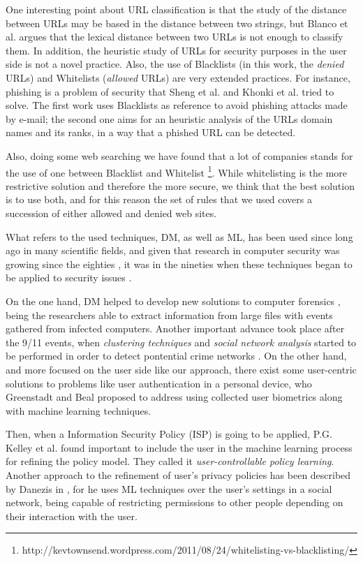 \documentclass{llncs}
\begin{document}
One interesting point about URL classification is that the study of the distance between URLs may be based in the distance between two strings, but Blanco et al. \cite{Blanco2011} argues that the lexical distance between two URLs is not enough to classify them. In addition, the heuristic study of URLs for security purposes in the user side is not a novel practice. Also, the use of Blacklists (in this work, the \textit{denied} URLs) and Whitelists (\textit{allowed} URLs) are very extended practices. For instance, phishing is a problem of security that Sheng et al.  and Khonki et al. \cite{Khonji2011} tried to solve. The first work uses Blacklists as reference to avoid phishing attacks made by e-mail; the second one aims for an heuristic analysis of the URLs domain names and its ranks, in a way that a phished URL can be detected.

Also, doing some web searching we have found that a lot of companies stands for the use of one between Blacklist and Whitelist \footnote{http://kevtownsend.wordpress.com/2011/08/24/whitelisting-vs-blacklisting/}. While whitelisting is the more restrictive solution and therefore the more secure, we think that the best solution is to use both, and for this reason the set of rules that we used covers a succession of either allowed and denied web sites.

What refers to the used techniques, DM, as well as ML, has been used since long ago in many scientific fields,
and given that research in computer security was growing since the
eighties \cite{computer_security_80}, it was in the nineties
when these techniques began to be applied to security issues
\cite{Clifton1996}. 

On the one hand, DM helped to develop new solutions to computer forensics \cite{DeVel2001}, being the researchers able to extract information from large files with events gathered from infected computers. Another important advance took place after the 9/11 events, when \textit{clustering techniques} and \textit{social network analysis} started to be performed in order to detect pontential crime networks \cite{Hsinchun2003}.
On the other hand, and more focused on the user side like our approach, there exist some user-centric solutions to problems like user authentication in a personal device, who Greenstadt and Beal \cite{cognitive_security_08} proposed to address using collected user biometrics along with machine learning techniques.
 
Then, when a Information Security Policy (ISP) is going to be applied, P.G. Kelley et al. \cite{user-controllable_learning_08} found important to include the user in the machine learning process for refining the policy model. They called it \textit{user-controllable policy learning}. Another approach to the refinement of user's privacy policies has been described by Danezis in \cite{inferring_policies_socialnetworks_09}, for he uses ML techniques over the user's settings in a social network, being capable of restricting permissions to other people depending on their interaction with the user.
\end{document}

